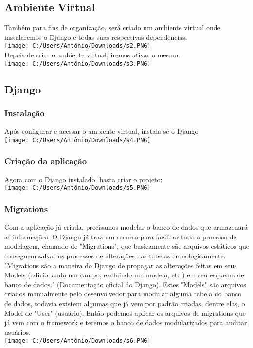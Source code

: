 \documentclass[11pt]{article} %
\begin{document}
\subsection{Ambiente Virtual}
Também para fins de organização, será criado um ambiente virtual onde instalaremos o Django e todas suas respectivas dependências.\\
\texttt{[image: C:/Users/Antônio/Downloads/s2.PNG]}\\
Depois de criar o ambiente virtual, iremos ativar o mesmo:\\
\texttt{[image: C:/Users/Antônio/Downloads/s3.PNG]}
\subsection{Django}
\subsubsection{Instalação}
Após configurar e acessar o ambiente virtual, instala-se o Django\\
\texttt{[image: C:/Users/Antônio/Downloads/s4.PNG]}
\subsubsection{Criação da aplicação}
Agora com o Django instalado, basta criar o projeto:\\
\texttt{[image: C:/Users/Antônio/Downloads/s5.PNG]}
\subsubsection{Migrations}
Com a aplicação já criada, precisamos modelar o banco de dados que armazenará as informações. O Django já traz um recurso para facilitar todo o processo de modelagem, chamado de "Migrations", que basicamente são arquivos estáticos que conseguem salvar os processos de alterações nas tabelas cronologicamente. "Migrations são a maneira do Django de propagar as alterações feitas em seus Models (adicionando um campo, excluindo um modelo, etc.) em seu esquema de banco de dados." (Documentação oficial do Django). Estes "Models" são arquivos criados manualmente pelo desenvolvedor para modular alguma tabela do banco de dados, todavia existem algumas que já vem por padrão criadas, dentre elas, o Model de "User" (usuário). Então podemos aplicar os arquivos de migrations que já vem com o framework e teremos o banco de dados modularizados para auditar usuários.\\
\texttt{[image: C:/Users/Antônio/Downloads/s6.PNG]}
\end{document}
